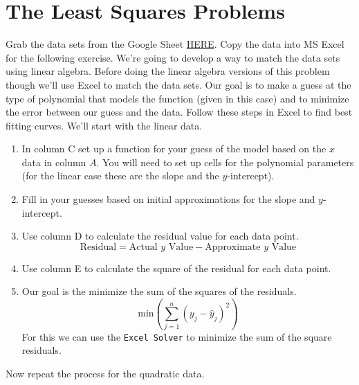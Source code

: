 \newpage\section{The Least Squares Problems}\label{sec:least_squares}
\begin{problem}\label{prob:least_squares_1}
    Grab the data sets from the Google Sheet
    \href{https://docs.google.com/spreadsheets/d/1bpqb51eTTtJbe9V1JLt_JkzN-8kbIh2RzisRQHIMLrY/edit?usp=sharing}{HERE}.
    Copy the data into MS Excel for the following exercise.  We're going to develop a way
    to match the data sets using linear algebra.  Before doing the linear algebra versions
    of this problem though we'll use Excel to match the data sets.  Our goal is to make a
    guess at the type of polynomial that models the function (given in this case) and to
    minimize the error between our guess and the data.  Follow these steps in Excel to
    find best fitting curves.  We'll start with the linear data.
    \begin{enumerate}
        \item In column C set up a function for your guess of the model based on the $x$ data in column
            $A$.  You will need to set up cells for the polynomial parameters (for the
            linear case these are the slope and the $y$-intercept).
        \item Fill in your guesses based on initial approximations for the slope and
            $y$-intercept.
        \item Use column D to calculate the residual value for each data point.
            \[ \text{Residual} = \text{Actual $y$ Value} - \text{Approximate $y$ Value} \]
        \item Use column E to calculate the square of the residual for each data point.
        \item Our goal is the minimize the sum of the squares of the residuals.
            \[ \text{min} \left( \sum_{j=1}^n \left( y_j - \hat{y}_j \right)^2 \right) \]
            For this we can use the \texttt{Excel Solver} to minimize the sum of the
            square residuals.
    \end{enumerate}
    Now repeat the process for the quadratic data.
\end{problem}




